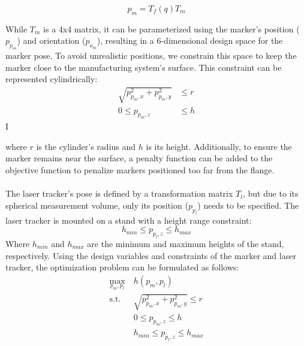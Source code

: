 \documentclass{svproc}
\begin{document}
\begin{equation}
    p_m = T_{f}(q)T_{m}
\end{equation}

While $T_{m}$ is a 4x4 matrix, it can be parameterized using the marker's position ($p_{p_m}$) and orientation ($p_{o_m}$), resulting in a 6-dimensional design space for the marker pose.
To avoid unrealistic positions, we constrain this space to keep the marker close to the manufacturing system's surface.
This constraint can be represented cylindrically:
\begin{equation}
    \begin{split}
        \sqrt{p_{p_m,x}^2 + p_{p_m,y}^2} &\leq r \\
        0 \leq p_{p_m,z} &\leq h
    \end{split}
\end{equation}I

where $r$ is the cylinder's radius and $h$ is its height.
Additionally, to ensure the marker remains near the surface, a penalty function can be added to the objective function to penalize markers positioned too far from the flange.\\
\\
The laser tracker's pose is defined by a transformation matrix $T_{l}$, but due to its spherical measurement volume, only its position ($p_{p_l}$) needs to be specified.
The laser tracker is mounted on a stand with a height range constraint:
\begin{equation}
    h_{min} \leq p_{p_l,z} \leq h_{max}
\end{equation}
Where $h_{min}$ and $h_{max}$ are the minimum and maximum heights of the stand, respectively.
Using the design variables and constraints of the marker and laser tracker, the optimization problem can be formulated as follows:
\begin{equation}
    \begin{split}
        \max_{p_m,p_l} & \ h(p_m,p_l) \\
        \text{s.t.} & \ \sqrt{p_{p_m,x}^2 + p_{p_m,y}^2} \leq r \\
        & \ 0 \leq p_{p_m,z} \leq h \\
        & \ h_{min} \leq p_{p_l,z} \leq h_{max} \\
    \end{split}
\end{equation}
\end{document}
